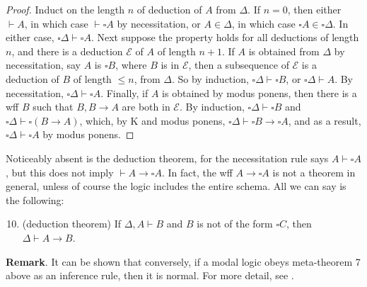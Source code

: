 \documentclass[12pt]{article}
\begin{document}
\begin{enumerate}
\begin{proof}  Induct on the length $n$ of deduction of $A$ from $\Delta$.  If $n=0$, then either $\vdash A$, in which case $\vdash \square A$ by necessitation, or $A\in \Delta$, in which case $\square A \in \square \Delta$.  In either case, $\square \Delta \vdash \square A$.  Next suppose the property holds for all deductions of length $n$, and there is a deduction $\mathcal{E}$ of $A$ of length $n+1$.  If $A$ is obtained from $\Delta$ by necessitation, say $A$ is $\square B$, where $B$ is in $\mathcal{E}$, then a subsequence of $\mathcal{E}$ is a deduction of $B$ of length $\le n$, from $\Delta$.  So by induction, $\square \Delta \vdash \square B$, or $\square \Delta \vdash A$.  By necessitation, $\square \Delta \vdash \square A$.  Finally, if $A$ is obtained by modus ponens, then there is a wff $B$ such that $B,B\to A$ are both in $\mathcal{E}$.  By induction, $\square \Delta\vdash \square B$ and $\square \Delta \vdash \square (B\to A)$, which, by K and modus ponens, $\square \Delta \vdash \square B\to \square A$, and as a result, $\square \Delta \vdash \square A$ by modus ponens.
\end{proof}
\end{enumerate}

Noticeably absent is the deduction theorem, for the necessitation rule says $A\vdash \square A$, but this does not imply $\vdash A\to \square A$.  In fact, the wff $A\to \square A$ is not a theorem in general, unless of course the logic includes the entire schema.  All we can say is the following:
\begin{enumerate}
\setcounter{enumi}{9}
\item (deduction theorem) If $\Delta, A\vdash B$ and $B$ is not of the form $\square C$, then $\Delta \vdash A \to B$.
\end{enumerate}
\textbf{Remark}.  It can be shown that conversely, if a modal logic obeys meta-theorem 7 above as an inference rule, then it is normal.  For more detail, see .

\end{document}
